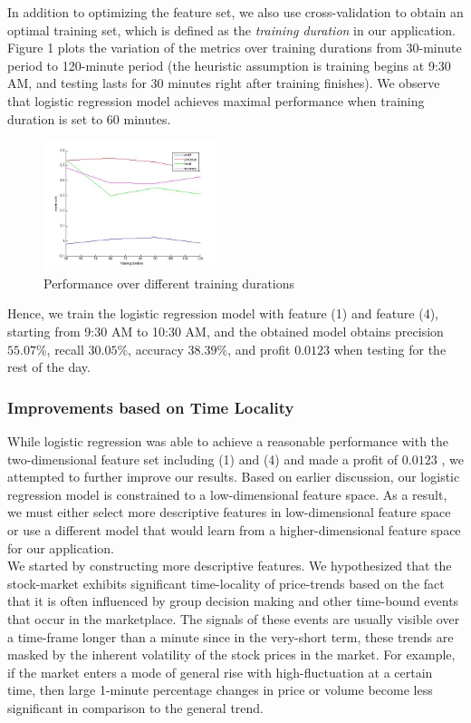 \documentclass[10pt,twocolumn,letterpaper]{article}
\begin{document}
In addition to optimizing the feature set, we also use cross-validation to obtain an optimal training set, which is defined as the \emph{training duration} in our application. Figure 1 plots the variation of the metrics over training durations from 30-minute period to 120-minute period (the heuristic assumption is training begins at 9:30 AM, and testing lasts for 30 minutes right after training finishes). We observe that logistic regression model achieves maximal performance when training duration is set to 60 minutes. 
\begin{figure}[H]
\caption{Performance over different training durations}
\includegraphics[width=0.45\textwidth]{tfreg_train}
\end{figure}

Hence, we train the logistic regression model with feature (1) and feature (4), starting from 9:30 AM to 10:30 AM, and the obtained model obtains precision $55.07\%$, recall $30.05\%$, accuracy $38.39\%$, and profit $0.0123$ when testing for the rest of the day.

\subsubsection{Improvements based on Time Locality}
While logistic regression was able to achieve a reasonable performance with the two-dimensional feature set including (1) and (4) and made a profit of $0.0123$ , we attempted to further improve our results. Based on earlier discussion, our logistic regression model is constrained to a low-dimensional feature space. As a result, we must either select more descriptive features in low-dimensional feature space or use a different model that would learn from a higher-dimensional feature space for our application.\\ 

We started by constructing more descriptive features. We hypothesized that the stock-market exhibits significant time-locality of price-trends based on the fact that it is often influenced by group decision making and other time-bound events that occur in the marketplace. The signals of these events are usually visible over a time-frame longer than a minute since in the very-short term, these trends are masked by the inherent volatility of the stock prices in the market. For example, if the market enters a mode of general rise with high-fluctuation at a certain time, then large 1-minute percentage changes in price or volume become less significant in comparison to the general trend.\\
\end{document}
